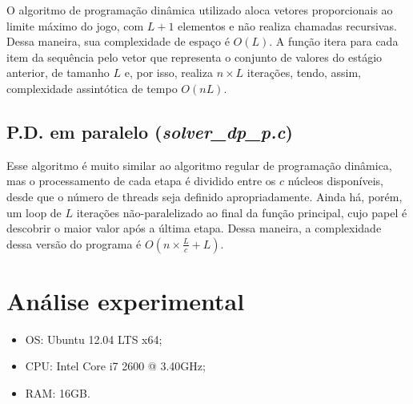 \documentclass[10pt,a4paper]{article}
\numberwithin{equation}{section}
\begin{document}
O algoritmo de programação dinâmica utilizado aloca vetores proporcionais ao limite máximo do jogo, com $L + 1$ elementos e não realiza chamadas recursivas. Dessa maneira, sua complexidade de espaço é $O(L)$. A função itera para cada item da sequência pelo vetor que representa o conjunto de valores do estágio anterior, de tamanho $L$ e, por isso, realiza $n \times L$ iterações, tendo, assim, complexidade assintótica de tempo $O(nL)$.

\subsection{P.D. em paralelo (\emph{solver\_dp\_p.c})}

Esse algoritmo é muito similar ao algoritmo regular de programação dinâmica, mas o processamento de cada etapa é dividido entre os $c$ núcleos disponíveis, desde que o número de threads seja definido apropriadamente. Ainda há, porém, um loop de $L$ iterações não-paralelizado ao final da função principal, cujo papel é descobrir o maior valor após a última etapa. Dessa maneira, a complexidade dessa versão do programa é $O(n \times \frac{L}{c} + L)$.

\section{Análise experimental}



\begin{itemize}
    \item OS: Ubuntu 12.04 LTS x64;
    \item CPU: Intel Core i7 2600 @ 3.40GHz;
    \item RAM: 16GB.
\end{itemize}
\end{document}
